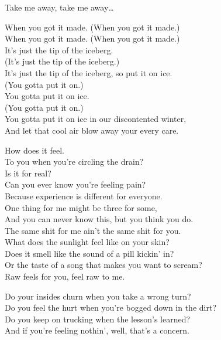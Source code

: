 Take me away, take me away… \\


When you got it made. (When you got it made.) \\
When you got it made. (When you got it made.) \\

It's just the tip of the iceberg. \\
(It's just the tip of the iceberg.) \\
It's just the tip of the iceberg, so put it on ice. \\
(You gotta put it on.) \\

You gotta put it on ice. \\
(You gotta put it on.) \\
You gotta put it on ice in our discontented winter, \\
And let that cool air blow away your every care. \\




How does it feel. \\
To you when you're circling the drain? \\
Is it for real? \\
Can you ever know you're feeling pain? \\
Because experience is different for everyone. \\
One thing for me might be three for some, \\
And you can never know this, but you think you do. \\
The same shit for me ain't the same shit for you. \\

What does the sunlight feel like on your skin? \\
Does it smell like the sound of a pill kickin' in? \\
Or the taste of a song that makes you want to scream? \\
Raw feels for you, feel raw to me. \\


Do your insides churn when you take a wrong turn? \\
Do you feel the hurt when you're bogged down in the dirt? \\
Do you keep on trucking when the lesson's learned? \\
And if you're feeling nothin', well, that's a concern. \\

